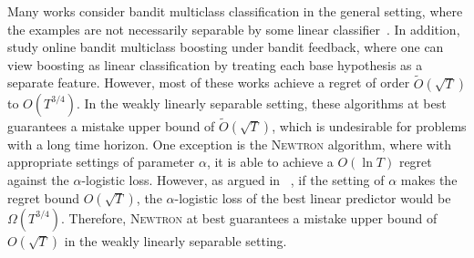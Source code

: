 

Many works consider bandit multiclass classification in the general setting,
where the examples are not necessarily separable by some linear
classifier~\cite{Abernethy-Rakhlin-2009, Wang-Jin-Valizadegan-2010,
Crammer-Gentile-2013, Hazan-Kale-2011, Beygelzimer-Orabona-Zhang-2017,
Foster-Kale-Luo-Mohri-Sridharan-2018}. In addition, \citet{Chen-Lin-Lu-2014,
Zhang-Jung-Tewari-2018} study online bandit multiclass boosting under bandit
feedback, where one can view boosting as linear classification by treating each
base hypothesis as a separate feature. However, most of these works achieve a
regret of order $\widetilde{O}(\sqrt{T})$ to $O(T^{3/4})$.
In the weakly linearly
separable setting, these algorithms at best guarantees a mistake upper bound of
$\widetilde{O}(\sqrt{T})$, which is undesirable for problems with a long time
horizon. One exception is the \textsc{Newtron} algorithm, where with appropriate
settings of parameter $\alpha$, it is able to achieve a $O(\ln T)$ regret against
the $\alpha$-logistic loss.
However, as argued in ~\citep[][Appendix D]{Beygelzimer-Orabona-Zhang-2017}, if
the setting of $\alpha$ makes the regret bound $O(\sqrt{T})$, the $\alpha$-logistic loss
of the best linear predictor would be $\Omega(T^{3/4})$. Therefore,
\textsc{Newtron} at best guarantees a mistake upper bound of
$O(\sqrt{T})$ in the weakly linearly separable setting.


